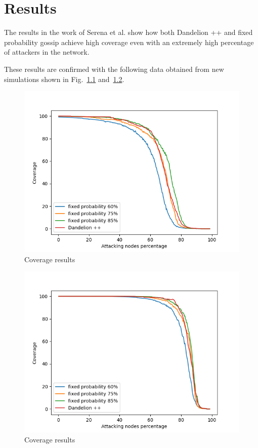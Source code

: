 \chapter{Results}
\label{sec:res}

The results in the work of Serena et al. show how both Dandelion ++ and fixed probability gossip achieve high coverage even with an extremely high percentage of attackers in the network\cite{lunes-dissemination}.

These results are confirmed with the following data obtained from new simulations shown in Fig.~\ref{fig:noatk40} and~\ref{fig:notatk80}.\par

\begin{figure}[h]
	\includegraphics[width=.8\textwidth]{pict/results/noatk-40.png}
	\centering 
	\caption{Coverage results}
	\label{fig:noatk40}
\end{figure}
\begin{figure}[h]
	\includegraphics[width=.8\textwidth]{pict/results/noatk-80.png}
	\centering 
	\caption{Coverage results}
	\label{fig:notatk80}
\end{figure}

